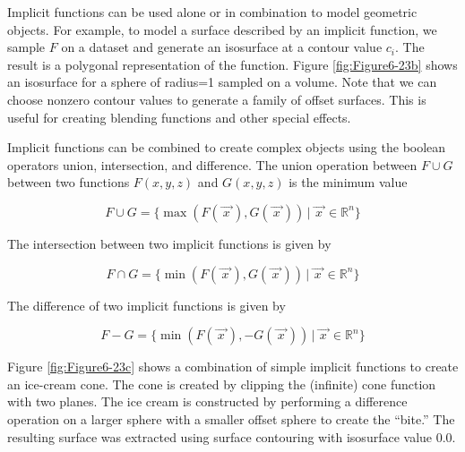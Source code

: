 \begin{description}[leftmargin=0cm,labelindent=0cm]

\item[Modelling Objects.] Implicit functions can be used alone or in combination to model geometric objects. For example, to model a surface described by an implicit function, we sample $F$ on a dataset and generate an isosurface at a contour value $c_i$. The result is a polygonal representation of the function. Figure \ref{fig:Figure6-23b} shows an isosurface for a sphere of radius=1 sampled on a volume. Note that we can choose nonzero contour values to generate a family of offset surfaces. This is useful for creating blending functions and other special effects.

Implicit functions can be combined to create complex objects using the boolean operators union, intersection, and difference. The union operation between $F\cup G$ between two functions $F(x,y,z)$ and $G(x,y,z)$ is the minimum value

\begin{equation}\label{eq:6.13}
F \cup G = \lbrace \max\left(F\left(\overrightarrow{\ x\ }\right), G\left(\overrightarrow{\ x\ }\right)\right)\, \vert \, \overrightarrow{\ x\ } \in \mathbb{R}^n \rbrace
\end{equation}

The intersection between two implicit functions is given by

\begin{equation}\label{eq:6.14}
F \cap G = \lbrace \min\left(F\left(\overrightarrow{\ x\ }\right), G\left(\overrightarrow{\ x\ }\right)\right)\, \vert \, \overrightarrow{\ x\ } \in \mathbb{R}^n  \rbrace
\end{equation}

The difference of two implicit functions is given by

\begin{equation}\label{eq:6.15}
F - G = \lbrace \min\left(F\left(\overrightarrow{\ x\ }\right), -G\left(\overrightarrow{\ x\ }\right)\right)\, \vert \, \overrightarrow{\ x\ } \in \mathbb{R}^n  \rbrace
\end{equation}

Figure \ref{fig:Figure6-23c} shows a combination of simple implicit functions to create an ice-cream cone. The cone is created by clipping the (infinite) cone function with two planes. The ice cream is constructed by performing a difference operation on a larger sphere with a smaller offset sphere to create the ``bite.'' The resulting surface was extracted using surface contouring with isosurface value $0.0$.


\end{description}
